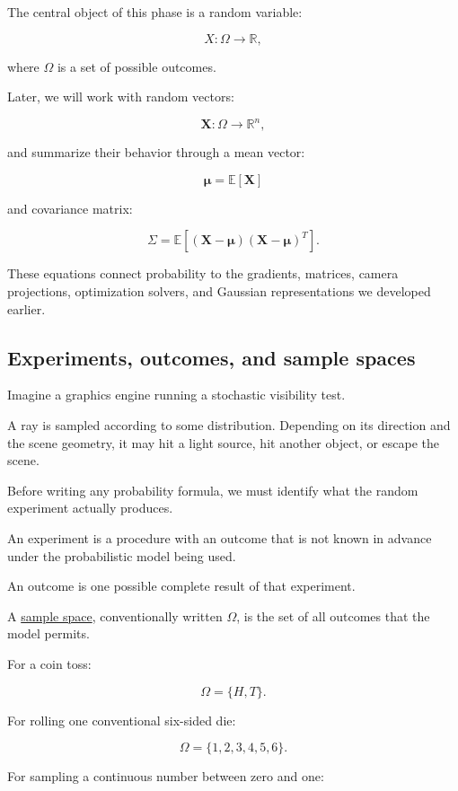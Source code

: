 The central object of this phase is a random variable:

\[
 X:\Omega\rightarrow\mathbb R,
\]

where \(\Omega\) is a set of possible outcomes.

Later, we will work with random vectors:

\[
 \mathbf X:\Omega\rightarrow\mathbb R^n,
\]

and summarize their behavior through a mean vector:

\[
 \boldsymbol\mu=\mathbb E[\mathbf X]
\]

and covariance matrix:

\[
 \Sigma= \mathbb E[ (\mathbf X-\boldsymbol\mu) (\mathbf X-\boldsymbol\mu)^T ].
\]

These equations connect probability to the gradients, matrices, camera projections, optimization solvers, and Gaussian representations we developed earlier.

\subsection{Experiments, outcomes, and sample spaces}\label{02-foundations-ii-ch023-experiments-outcomes-and-sample-spaces}

Imagine a graphics engine running a stochastic visibility test.

A ray is sampled according to some distribution. Depending on its direction and the scene geometry, it may hit a light source, hit another object, or escape the scene.

Before writing any probability formula, we must identify what the random experiment actually produces.

An experiment is a procedure with an outcome that is not known in advance under the probabilistic model being used.

An outcome is one possible complete result of that experiment.

A \hyperref[02-foundations-ii-ch023-a-probability-model-begins-with-possible-outcomes]{sample space}, conventionally written \(\Omega\), is the set of all outcomes that the model permits.

For a coin toss:

\[
 \Omega=\{H,T\}.
\]

For rolling one conventional six-sided die:

\[
 \Omega=\{1,2,3,4,5,6\}.
\]

For sampling a continuous number between zero and one:

